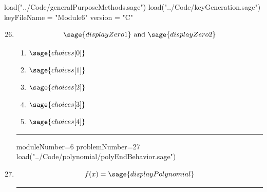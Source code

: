 \documentclass[14pt]{article}
\newcommand{\litem}[1]{\item#1\hspace*{-1cm}\rule{\textwidth}{0.4pt}}
\begin{document}
\pagestyle{fancy}

\begin{sagesilent}
load("../Code/generalPurposeMethods.sage")
load("../Code/keyGeneration.sage")
keyFileName = "Module6"
version = "C"
\end{sagesilent}

\begin{enumerate}
\setcounter{enumi}{25}


\begin{sagesilent}
moduleNumber=6
problemNumber=26
load("../Code/polynomial/constructPolyComplex.sage")
\end{sagesilent}

\litem{	

	\[ \sage{displayZero1} \text{ and } \sage{displayZero2} \]

	\begin{enumerate}[label=\Alph*.]
		\item \( \sage{choices[0]} \)
		\item \( \sage{choices[1]} \)
		\item \( \sage{choices[2]} \)
		\item \( \sage{choices[3]} \)
		\item \( \sage{choices[4]} \)
	\end{enumerate}
}

\begin{sagesilent}
moduleNumber=6
problemNumber=27
load("../Code/polynomial/polyEndBehavior.sage")
\end{sagesilent}

\litem{ 

	\[ f(x) = \sage{displayPolynomial} \]

}
\end{enumerate}
\end{document}
